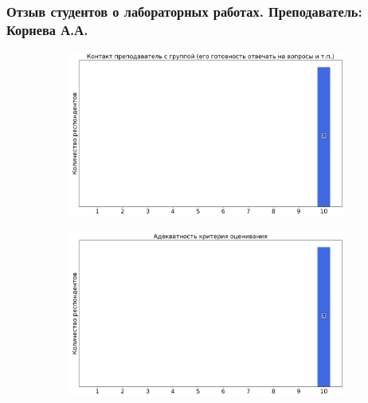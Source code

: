     \subsubsection{Отзыв студентов о лабораторных работах. Преподаватель: Корнева А.А.}
        \begin{figure}[H]
            \centering
            \begin{subfigure}[b]{0.45\textwidth}
                \centering
                \includegraphics[width=\textwidth]{images/1 course/Общая физика - механика/labniks-marks-Корнева А.А.-0.png}
            \end{subfigure}
            \begin{subfigure}[b]{0.45\textwidth}
                \centering
                \includegraphics[width=\textwidth]{images/1 course/Общая физика - механика/labniks-marks-Корнева А.А.-1.png}
            \end{subfigure}
            \begin{subfigure}[b]{0.45\textwidth}
                \centering

\end{subfigure}
\end{figure}
